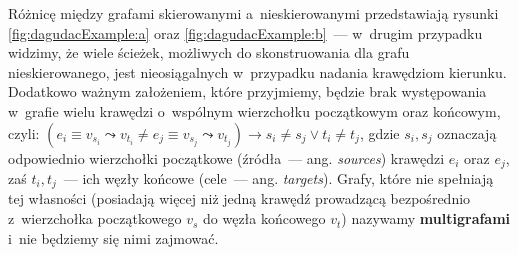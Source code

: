 Różnicę między grafami skierowanymi a~nieskierowanymi przedstawiają rysunki \ref{fig:dagudacExample:a} oraz \ref{fig:dagudacExample:b}~--- w~drugim przypadku widzimy, że wiele ścieżek, możliwych do skonstruowania dla grafu nieskierowanego, jest nieosiągalnych w~przypadku nadania krawędziom kierunku.
Dodatkowo ważnym założeniem, które przyjmiemy, będzie brak występowania w~grafie wielu krawędzi o~wspólnym wierzchołku początkowym oraz końcowym, czyli: $\left( e_{i} \equiv v_{s_{i}} \leadsto v_{t_{i}} \neq e_{j} \equiv v_{s_{j}} \leadsto v_{t_{j}} \right) \rightarrow s_{i} \neq s_{j} \vee t_{i} \neq t_{j}$, gdzie $s_{i}, s_{j}$ oznaczają odpowiednio wierzchołki początkowe (źródła~--- ang. \textit{sources}) krawędzi $e_{i}$ oraz $e_{j}$, zaś $t_{i}, t_{j}$~--- ich węzły końcowe (cele~--- ang. \textit{targets}).
Grafy, które nie spełniają tej własności (posiadają więcej niż jedną krawędź prowadzącą bezpośrednio z~wierzchołka początkowego $v_{s}$ do węzła końcowego $v_{t}$) nazywamy \textbf{multigrafami} i~nie będziemy się nimi zajmować.

